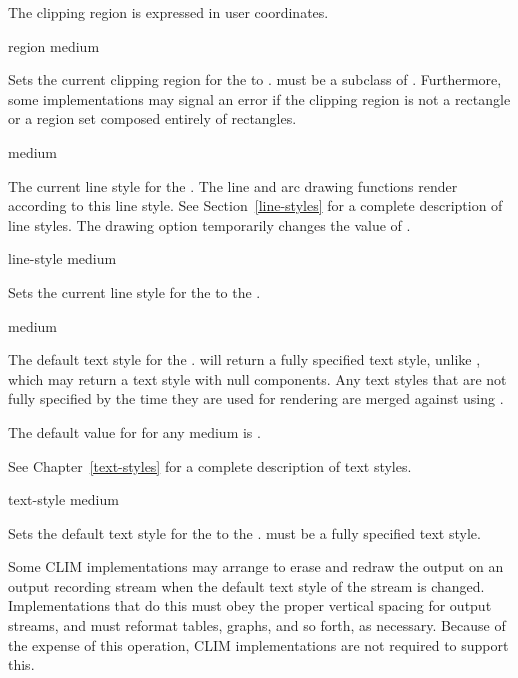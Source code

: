 The clipping region is expressed in user coordinates.

 {region medium}

Sets the current clipping region for the   to
.   must be a subclass of .  Furthermore, some
implementations may signal an error if the clipping region is not a rectangle or
a region set composed entirely of rectangles.


 {medium}

The current line style for the  .  The line and arc
drawing functions render according to this line style.  See
Section~\ref{line-styles} for a complete description of line styles.  The
 drawing option temporarily changes the value of
.

 {line-style medium}

Sets the current line style for the   to the  .


 {medium}

The default text style for the  .
 will return a fully specified text style, unlike
, which may return a text style with null components.  Any
text styles that are not fully specified by the time they are used for rendering
are merged against  using .

The default value for  for any medium is
.

See Chapter~\ref{text-styles} for a complete description of text styles.

 {text-style medium}

Sets the default text style for the   to the  .   must be a fully specified text style.

Some CLIM implementations may arrange to erase and redraw the output on an
output recording stream when the default text style of the stream is changed.
Implementations that do this must obey the proper vertical spacing for output
streams, and must reformat tables, graphs, and so forth, as necessary.  Because
of the expense of this operation, CLIM implementations are not required to
support this.


